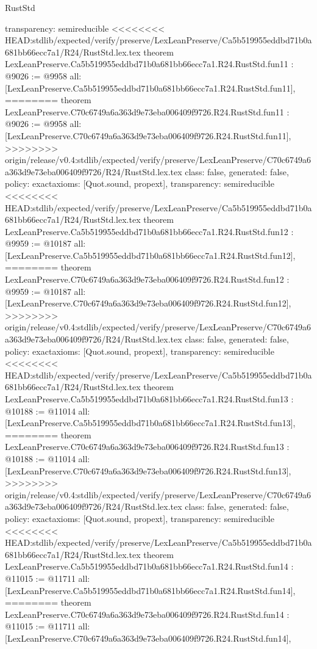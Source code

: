 \begin{lexlean}{RustStd}
\begin{coremodule}
{\begin{coremodule}
{{{{{{{{{{{{{{  transparency: semireducible
}
<<<<<<<< HEAD:stdlib/expected/verify/preserve/LexLeanPreserve/Ca5b519955eddbd71b0a681bb66ecc7a1/R24/RustStd.lex.tex
theorem LexLeanPreserve.Ca5b519955eddbd71b0a681bb66ecc7a1.R24.RustStd.fun11 : @9026 := @9958 {
  all: [LexLeanPreserve.Ca5b519955eddbd71b0a681bb66ecc7a1.R24.RustStd.fun11],
========
theorem LexLeanPreserve.C70c6749a6a363d9e73eba006409f9726.R24.RustStd.fun11 : @9026 := @9958 {
  all: [LexLeanPreserve.C70c6749a6a363d9e73eba006409f9726.R24.RustStd.fun11],
>>>>>>>> origin/release/v0.4:stdlib/expected/verify/preserve/LexLeanPreserve/C70c6749a6a363d9e73eba006409f9726/R24/RustStd.lex.tex
  class: false,
  generated: false,
  policy: exact{axioms: [Quot.sound, propext]},
  transparency: semireducible
}
<<<<<<<< HEAD:stdlib/expected/verify/preserve/LexLeanPreserve/Ca5b519955eddbd71b0a681bb66ecc7a1/R24/RustStd.lex.tex
theorem LexLeanPreserve.Ca5b519955eddbd71b0a681bb66ecc7a1.R24.RustStd.fun12 : @9959 := @10187 {
  all: [LexLeanPreserve.Ca5b519955eddbd71b0a681bb66ecc7a1.R24.RustStd.fun12],
========
theorem LexLeanPreserve.C70c6749a6a363d9e73eba006409f9726.R24.RustStd.fun12 : @9959 := @10187 {
  all: [LexLeanPreserve.C70c6749a6a363d9e73eba006409f9726.R24.RustStd.fun12],
>>>>>>>> origin/release/v0.4:stdlib/expected/verify/preserve/LexLeanPreserve/C70c6749a6a363d9e73eba006409f9726/R24/RustStd.lex.tex
  class: false,
  generated: false,
  policy: exact{axioms: [Quot.sound, propext]},
  transparency: semireducible
}
<<<<<<<< HEAD:stdlib/expected/verify/preserve/LexLeanPreserve/Ca5b519955eddbd71b0a681bb66ecc7a1/R24/RustStd.lex.tex
theorem LexLeanPreserve.Ca5b519955eddbd71b0a681bb66ecc7a1.R24.RustStd.fun13 : @10188 := @11014 {
  all: [LexLeanPreserve.Ca5b519955eddbd71b0a681bb66ecc7a1.R24.RustStd.fun13],
========
theorem LexLeanPreserve.C70c6749a6a363d9e73eba006409f9726.R24.RustStd.fun13 : @10188 := @11014 {
  all: [LexLeanPreserve.C70c6749a6a363d9e73eba006409f9726.R24.RustStd.fun13],
>>>>>>>> origin/release/v0.4:stdlib/expected/verify/preserve/LexLeanPreserve/C70c6749a6a363d9e73eba006409f9726/R24/RustStd.lex.tex
  class: false,
  generated: false,
  policy: exact{axioms: [Quot.sound, propext]},
  transparency: semireducible
}
<<<<<<<< HEAD:stdlib/expected/verify/preserve/LexLeanPreserve/Ca5b519955eddbd71b0a681bb66ecc7a1/R24/RustStd.lex.tex
theorem LexLeanPreserve.Ca5b519955eddbd71b0a681bb66ecc7a1.R24.RustStd.fun14 : @11015 := @11711 {
  all: [LexLeanPreserve.Ca5b519955eddbd71b0a681bb66ecc7a1.R24.RustStd.fun14],
========
theorem LexLeanPreserve.C70c6749a6a363d9e73eba006409f9726.R24.RustStd.fun14 : @11015 := @11711 {
  all: [LexLeanPreserve.C70c6749a6a363d9e73eba006409f9726.R24.RustStd.fun14],
}}}}}}}}}}}}}}}}}}
\end{coremodule}}
\end{coremodule}
\end{lexlean}
